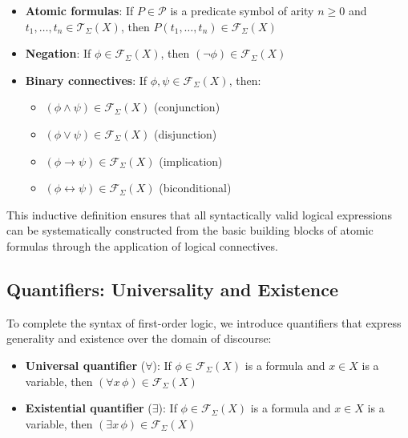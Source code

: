 \documentclass[11pt,a4paper]{article}
\theoremstyle{definition}
\theoremstyle{plain}
\theoremstyle{remark}
\begin{document}
\begin{itemize}
    \item \textbf{Atomic formulas}: If $P \in \mathcal{P}$ is a predicate symbol of arity $n \geq 0$ and $t_1, \dots, t_n \in \mathcal{T}_\Sigma(X)$, then $P(t_1, \dots, t_n) \in \mathcal{F}_\Sigma(X)$

    \item \textbf{Negation}: If $\phi \in \mathcal{F}_\Sigma(X)$, then $(\neg \phi) \in \mathcal{F}_\Sigma(X)$

    \item \textbf{Binary connectives}: If $\phi, \psi \in \mathcal{F}_\Sigma(X)$, then:
        \begin{itemize}
            \item $(\phi \wedge \psi) \in \mathcal{F}_\Sigma(X)$ (conjunction)
            \item $(\phi \vee \psi) \in \mathcal{F}_\Sigma(X)$ (disjunction)
            \item $(\phi \rightarrow \psi) \in \mathcal{F}_\Sigma(X)$ (implication)
            \item $(\phi \leftrightarrow \psi) \in \mathcal{F}_\Sigma(X)$ (biconditional)
        \end{itemize}
\end{itemize}


This inductive definition ensures that all syntactically valid logical expressions can be systematically constructed from the basic building blocks of atomic formulas through the application of logical connectives.

\subsection{Quantifiers: Universality and Existence}

To complete the syntax of first-order logic, we introduce quantifiers that express generality and existence over the domain of discourse:

\begin{itemize}
    \item \textbf{Universal quantifier} ($\forall$): If $\phi \in \mathcal{F}_\Sigma(X)$ is a formula and $x \in X$ is a variable, then $(\forall x \, \phi) \in \mathcal{F}_\Sigma(X)$
    \item \textbf{Existential quantifier} ($\exists$): If $\phi \in \mathcal{F}_\Sigma(X)$ is a formula and $x \in X$ is a variable, then $(\exists x \, \phi) \in \mathcal{F}_\Sigma(X)$
\end{itemize}
\end{document}
